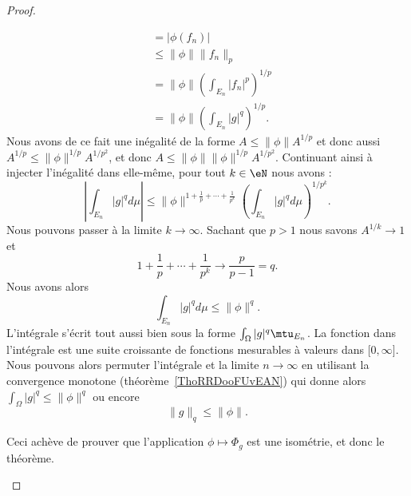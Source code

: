 \begin{proof}
\begin{subproof}
\begin{subequations}
\begin{align}
                    &=|\phi(f_n)|\\
                    &\leq \| \phi \|\| f_n \|_p\\
                    &=\| \phi \|\left( \int_{E_n}| f_n |^p \right)^{1/p}\\
                    &=\| \phi \|\left( \int_{E_n}| g |^q \right)^{1/p}.
                \end{align}
            \end{subequations}
            Nous avons de ce fait une inégalité de la forme \( A\leq \| \phi \|A^{1/p}\) et donc aussi \( A^{1/p}\leq \| \phi \|^{1/p}A^{1/p^2}\), et donc \( A\leq \| \phi \|\| \phi \|^{1/p}A^{1/p^2}\). Continuant ainsi à injecter l'inégalité dans elle-même, pour tout \( k\in \eN\) nous avons :
            \begin{equation}
                \left| \int_{E_n}| g |^qd\mu \right| \leq\| \phi \|^{1+\frac{1}{ p }+\cdots+\frac{1}{ p^k }}\left( \int_{E_n}| g |^qd\mu \right)^{1/p^k}.
            \end{equation}
            Nous pouvons passer à la limite \( k\to \infty\). Sachant que \( p>1\) nous savons \( A^{1/k}\to 1\) et
            \begin{equation}
                1+\frac{1}{ p }+\cdots+\frac{1}{ p^k }\to\frac{ p }{ p-1 }=q.
            \end{equation}
            Nous avons alors
            \begin{equation}
                \int_{E_n}| g |^qd\mu\leq \| \phi \|^q.
            \end{equation}
            L'intégrale s'écrit tout aussi bien sous la forme \( \int_{\Omega}| g  |^q\mtu_{E_n}\). La fonction dans l'intégrale est une suite croissante de fonctions mesurables à valeurs dans \( \mathopen[ 0 , \infty \mathclose]\). Nous pouvons alors permuter l'intégrale et la limite \( n\to \infty\) en utilisant la convergence monotone (théorème~\ref{ThoRRDooFUvEAN}) qui donne alors \( \int_{\Omega}| g |^q\leq \| \phi \|^q\) ou encore
            \begin{equation}
                \| g \|_q\leq \| \phi \|.
            \end{equation}

            Ceci achève de prouver que l'application \( \phi\mapsto \Phi_g\) est une isométrie, et donc le théorème.
    \end{subproof}
\end{proof}

